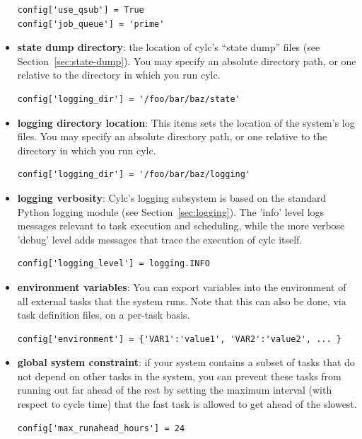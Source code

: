 \documentclass[11pt,a4paper]{article}
\begin{document}
\begin{itemize}
        \begin{lstlisting}
config['use_qsub'] = True
config['job_queue'] = 'prime'
        \end{lstlisting}

    \item {\bf state dump directory}: the location of cylc's ``state
        dump'' files (see Section~\ref{sec:state-dump}).  You may
        specify an absolute directory path, or one relative to the
        directory in which you run cylc.
        
        \begin{lstlisting}
config['logging_dir'] = '/foo/bar/baz/state'
        \end{lstlisting}


    \item {\bf logging directory location}: 
        This items sets the location of the system's log files. You may
        specify an absolute directory path, or one relative to the
        directory in which you run cylc.

        \begin{lstlisting}
config['logging_dir'] = '/foo/bar/baz/logging'
        \end{lstlisting}

    \item {\bf logging verbosity}: Cylc's logging subsystem is based on
        the standard Python logging module (see
        Section~\ref{sec:logging}). The 'info' level logs messages
        relevant to task execution and scheduling, while the more
        verbose 'debug' level adds messages that trace the execution of
        cylc itself.

        \begin{lstlisting}
config['logging_level'] = logging.INFO
        \end{lstlisting}

    \item {\bf environment variables}: You can export variables into the 
        environment of all external tasks that the system runs. Note that
        this can also be done, via task definition files, on a per-task
        basis.

        \begin{lstlisting}
config['environment'] = {'VAR1':'value1', 'VAR2':'value2', ... }
        \end{lstlisting}

    \item {\bf global system constraint}: if your system contains a
        subset of tasks that do not depend on other tasks in the system, 
        you can prevent these tasks from running out far ahead of the 
        rest by setting the maximum interval (with respect to cycle
        time) that the fast task is allowed to get ahead of the slowest.
        
        \begin{lstlisting}
config['max_runahead_hours'] = 24
        \end{lstlisting}

\end{itemize}
\end{document}
